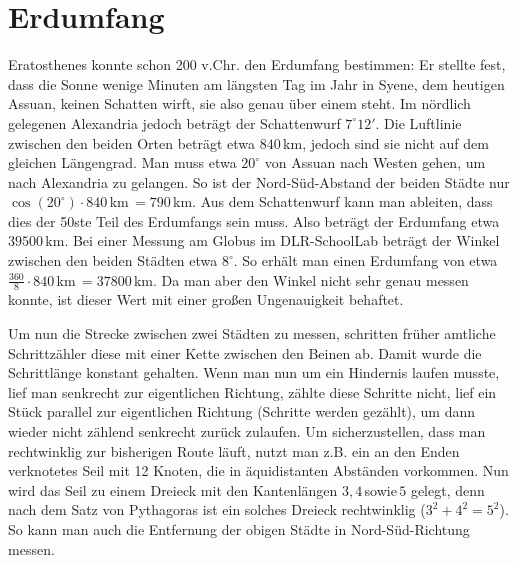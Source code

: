 \documentclass[12pt,a4paper,headinclude,bibtotoc]{scrartcl}
\begin{document}
\section{Erdumfang}
Eratosthenes konnte schon 200 v.Chr. den Erdumfang bestimmen:
Er stellte fest, dass die Sonne wenige Minuten am längsten Tag im Jahr in Syene, dem heutigen Assuan, keinen Schatten wirft, sie also genau über einem steht. Im nördlich gelegenen Alexandria jedoch beträgt der Schattenwurf $7^\circ12'$.
Die Luftlinie zwischen den beiden Orten beträgt etwa $840\,$km, jedoch sind sie nicht auf dem gleichen Längengrad. Man muss etwa $20^\circ$ von Assuan nach Westen gehen, um nach Alexandria zu gelangen.
So ist der Nord-Süd-Abstand der beiden Städte nur $\cos(20^\circ) \cdot 840\,$km$\,= 790\,$km.
Aus dem Schattenwurf kann man ableiten, dass dies der 50ste Teil des Erdumfangs sein muss.
Also beträgt der Erdumfang etwa $39500\,$km.
Bei einer Messung am Globus im DLR-SchoolLab beträgt der Winkel zwischen den beiden Städten etwa $8^\circ$.
So erhält man einen Erdumfang von etwa $\frac{360}{8} \cdot 840\,$km$\,=37800\,$km.
Da man aber den Winkel nicht sehr genau messen konnte, ist dieser Wert mit einer großen Ungenauigkeit behaftet.


Um nun die Strecke zwischen zwei Städten zu messen, schritten früher amtliche Schrittzähler diese mit einer Kette zwischen den Beinen ab.
Damit wurde die Schrittlänge konstant gehalten.
Wenn man nun um ein Hindernis laufen musste, lief man senkrecht zur eigentlichen Richtung, zählte diese Schritte nicht, lief ein Stück parallel  zur eigentlichen Richtung (Schritte werden gezählt), um dann wieder nicht zählend senkrecht zurück zulaufen.
Um sicherzustellen, dass man rechtwinklig zur bisherigen Route läuft, nutzt man z.B. ein an den Enden verknotetes Seil mit 12 Knoten, die in äquidistanten Abständen vorkommen.
Nun wird das Seil zu einem Dreieck mit den Kantenlängen $3,4\,$sowie$\,5$ gelegt, denn nach dem Satz von Pythagoras ist ein solches Dreieck rechtwinklig ($3^2+4^2=5^2$).
So kann man auch die Entfernung der obigen Städte in Nord-Süd-Richtung messen.
\end{document}
